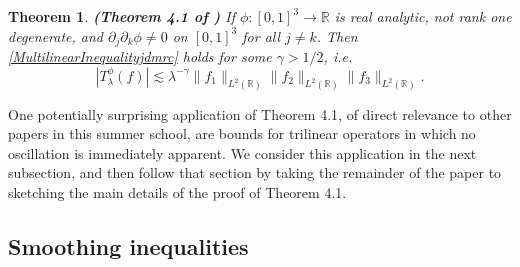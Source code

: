 \documentclass[12pt]{amsart}
\newtheorem{thm}{Theorem}
\newcommand*{\R}{\mathbb{R}}
\begin{document}
\begin{thm} \label{MainOscillatoryTheoremjdmrc} \textbf{(Theorem 4.1 of \cite{ChristTopicPaperjdmrc})}
    If $\phi: [0,1]^3 \to \R$ is real analytic, not rank one degenerate, and $\partial_j \partial_k \phi \neq 0$ on $[0,1]^3$ for all $j \neq k$. Then \eqref{MultilinearInequalityjdmrc} holds for some $\gamma > 1/2$, i.e.
    \begin{equation}
        |T^\phi_\lambda(f)| \lesssim \lambda^{-\gamma} \| f_1 \|_{L^2(\R)} \| f_2 \|_{L^2(\R)} \| f_3 \|_{L^2(\R)}.
    \end{equation}
\end{thm}



One potentially surprising application of Theorem 4.1, of direct relevance to other papers in this summer school, are bounds for trilinear operators in which no oscillation is immediately apparent. We consider this application in the next subsection, and then follow that section by taking the remainder of the paper to sketching the main details of the proof of Theorem 4.1.

\subsection{Smoothing inequalities}
\end{document}

